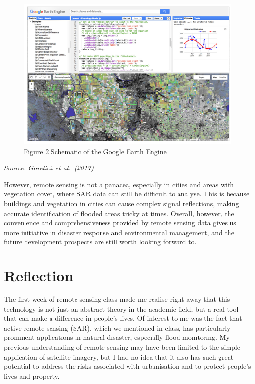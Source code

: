 \documentclass[
  letterpaper,
  DIV=11,
  numbers=noendperiod]{scrreprt}
\begin{document}
\begin{figure}[H]

{\centering \includegraphics[width=0.7\linewidth,height=\textheight,keepaspectratio]{images/Geewk1.png}

}

\caption{Figure 2 Schematic of the Google Earth Engine}

\end{figure}%

\emph{Source: \href{https://doi.org/10.1016/j.rse.2017.06.031}{Gorelick
et al.~(2017)}}

However, remote sensing is not a panacea, especially in cities and areas
with vegetation cover, where SAR data can still be difficult to analyse.
This is because buildings and vegetation in cities can cause complex
signal reflections, making accurate identification of flooded areas
tricky at times. Overall, however, the convenience and comprehensiveness
provided by remote sensing data gives us more initiative in disaster
response and environmental management, and the future development
prospects are still worth looking forward to.

\section*{Reflection}\label{reflection}


The first week of remote sensing class made me realise right away that
this technology is not just an abstract theory in the academic field,
but a real tool that can make a difference in people's lives. Of
interest to me was the fact that active remote sensing (SAR), which we
mentioned in class, has particularly prominent applications in natural
disaster, especially flood monitoring. My previous understanding of
remote sensing may have been limited to the simple application of
satellite imagery, but I had no idea that it also has such great
potential to address the risks associated with urbanisation and to
protect people's lives and property.
\end{document}
